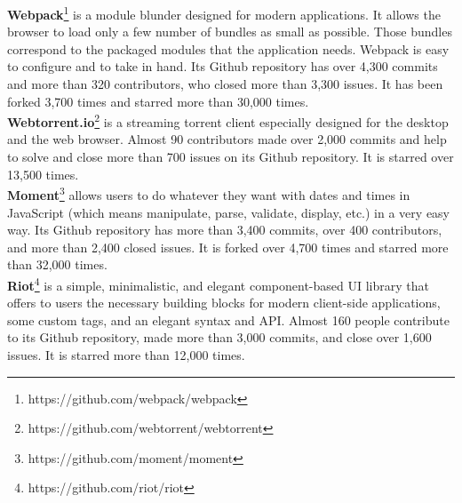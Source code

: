 {\textbf{Webpack}\footnote{https://github.com/webpack/webpack} is a module blunder designed for modern applications. It allows the browser to load only a few number of bundles as small as possible. Those bundles correspond to the packaged modules that the application needs. Webpack is easy to configure and to take in hand. Its Github repository has over 4,300 commits and more than 320 contributors, who closed more than 3,300 issues. It has been forked 3,700 times and starred more than 30,000 times.\\
\textbf{Webtorrent.io}\footnote{https://github.com/webtorrent/webtorrent} is a streaming torrent client especially designed for the desktop and the web browser. Almost 90 contributors made over 2,000 commits and help to solve and close more than 700 issues on its Github repository. It is starred over 13,500 times.\\
\textbf{Moment}\footnote{https://github.com/moment/moment} allows users to do whatever they want with dates and times in JavaScript (which means manipulate, parse, validate, display, etc.) in a very easy way. Its Github repository has more than 3,400 commits, over 400 contributors, and more than 2,400 closed issues. It is forked over 4,700 times and starred more than 32,000 times.\\
\textbf{Riot}\footnote{https://github.com/riot/riot} is a simple, minimalistic, and elegant component-based UI library that offers to users the necessary building blocks for modern client-side applications, some custom tags, and an elegant syntax and API. Almost 160 people contribute to its Github repository, made more than 3,000 commits, and close over 1,600 issues. It is starred more than 12,000 times.
}
